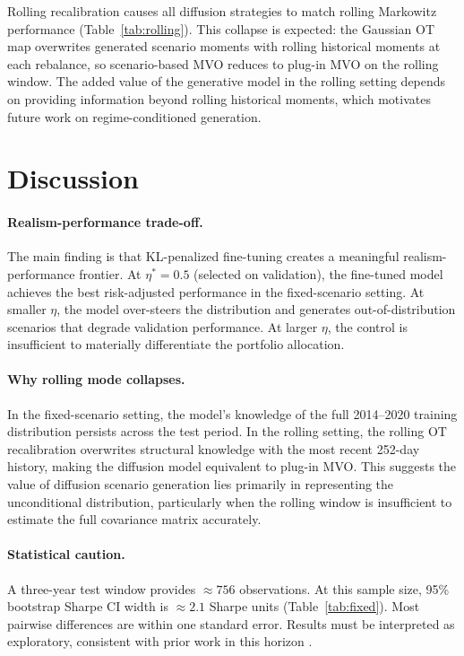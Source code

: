 \documentclass{article}
\begin{document}
Rolling recalibration causes all diffusion strategies to match rolling Markowitz
performance (Table~\ref{tab:rolling}). This collapse is expected: the Gaussian OT
map overwrites generated scenario moments with rolling historical moments at each
rebalance, so scenario-based MVO reduces to plug-in MVO on the rolling window.
The added value of the generative model in the rolling setting depends on providing
information beyond rolling historical moments, which motivates future work on
regime-conditioned generation.

\section{Discussion}
\label{sec:discussion}

\paragraph{Realism-performance trade-off.}
The main finding is that KL-penalized fine-tuning creates a meaningful
realism-performance frontier. At $\eta^*=0.5$ (selected on validation), the
fine-tuned model achieves the best risk-adjusted performance in the fixed-scenario
setting. At smaller $\eta$, the model over-steers the distribution and generates
out-of-distribution scenarios that degrade validation performance. At larger $\eta$,
the control is insufficient to materially differentiate the portfolio allocation.

\paragraph{Why rolling mode collapses.}
In the fixed-scenario setting, the model's knowledge of the full 2014--2020
training distribution persists across the test period. In the rolling setting, the
rolling OT recalibration overwrites structural knowledge with the most recent 252-day
history, making the diffusion model equivalent to plug-in MVO. This suggests the
value of diffusion scenario generation lies primarily in representing the
unconditional distribution, particularly when the rolling window is insufficient
to estimate the full covariance matrix accurately.

\paragraph{Statistical caution.}
A three-year test window provides $\approx756$ observations. At this sample size,
95\% bootstrap Sharpe CI width is $\approx2.1$ Sharpe units (Table~\ref{tab:fixed}).
Most pairwise differences are within one standard error. Results must be
interpreted as exploratory, consistent with prior work in this horizon
\citep{bailey2014pseudo}.
\end{document}
